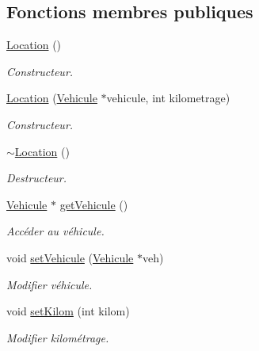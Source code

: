 \subsection*{Fonctions membres publiques}
\begin{DoxyCompactItemize}
\item 
\hyperlink{class_location_a87790c14997fd8cdd12080c78c9794bb}{Location} ()
\begin{DoxyCompactList}\small\item\em Constructeur. \item\end{DoxyCompactList}\item 
\hyperlink{class_location_a104db0410ddd4543691f3c5c4514af7a}{Location} (\hyperlink{class_vehicule}{Vehicule} $\ast$vehicule, int kilometrage)
\begin{DoxyCompactList}\small\item\em Constructeur. \item\end{DoxyCompactList}\item 
\hyperlink{class_location_af5be2c6550bbd96137cbb3144ec3c529}{$\sim$Location} ()
\begin{DoxyCompactList}\small\item\em Destructeur. \item\end{DoxyCompactList}\item 
\hyperlink{class_vehicule}{Vehicule} $\ast$ \hyperlink{class_location_a3f130f10a4a558d6b792b1e538e9fb40}{getVehicule} ()
\begin{DoxyCompactList}\small\item\em Accéder au véhicule. \item\end{DoxyCompactList}\item 
void \hyperlink{class_location_a66eaf6883a88c65a6281ccf111db3c03}{setVehicule} (\hyperlink{class_vehicule}{Vehicule} $\ast$veh)
\begin{DoxyCompactList}\small\item\em Modifier véhicule. \item\end{DoxyCompactList}\item 
void \hyperlink{class_location_a4971bacb1641fa3605d986fd87d10814}{setKilom} (int kilom)
\begin{DoxyCompactList}\small\item\em Modifier kilométrage. \item\end{DoxyCompactList}\item 

\end{DoxyCompactItemize}
